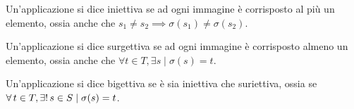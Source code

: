 \begin{definition}[Iniettività]
    Un'applicazione si dice iniettiva se ad ogni immagine
    è corrisposto al più un elemento, ossia anche che
    $s_1 \neq s_2 \implies \sigma(s_1) \neq \sigma(s_2)$.
\end{definition}

\begin{definition}[Surgettività]
    Un'applicazione si dice surgettiva se ad ogni immagine
    è corrisposto almeno un elemento, ossia anche che
    $\forall t \in T, \exists s \mid \sigma(s) = t$.
\end{definition}

\begin{definition}[Bigettività]
    Un'applicazione si dice bigettiva se è sia iniettiva che
    suriettiva, ossia se $\forall t \in T, \existsone s \in S
        \mid \sigma(s) = t$.
\end{definition}
